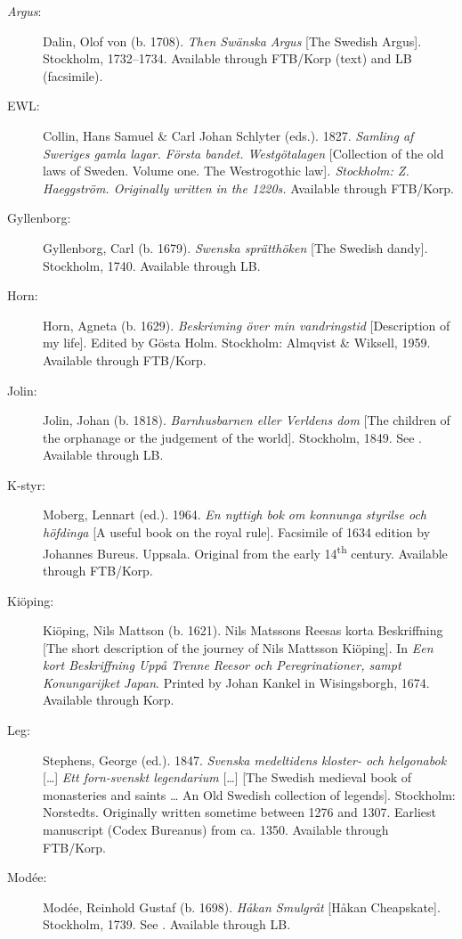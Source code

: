 \documentclass[output=paper]{langscibook}
\begin{document}
\begin{description}\sloppy
\item[\textit{Argus}:] Dalin, Olof von (b. 1708). \textit{Then Swänska Argus} [The Swedish Argus]. Stockholm, 1732–1734. Available through FTB/Korp (text) and LB (facsimile).
\item[EWL:] Collin, Hans Samuel \& Carl Johan Schlyter (eds.). 1827. \emph{Samling af Sweriges gamla lagar. Första bandet. Westgötalagen} [Collection of the old laws of Sweden. Volume one. The Westrogothic law]\emph{. \textup{Stockholm: Z. Haeggström}. \textup{Originally written in the 1220s.} }Available through FTB/Korp.
\item[Gyllenborg:] Gyllenborg, Carl (b. 1679). \textit{Swenska sprätthöken} [The Swedish dandy]. Stockholm, 1740. Available through LB.
\item[Horn:] Horn, Agneta (b. 1629). \textit{Beskrivning över min vandringstid} [Description of my life]. Edited by Gösta Holm. Stockholm: Almqvist \& Wiksell, 1959. Available through FTB/Korp.
\item[Jolin:] Jolin, Johan (b. 1818). \textit{Barnhusbarnen eller Verldens dom} [The children of the orphanage or the judgement of the world]. Stockholm, 1849. See \citet{MarttalaStromquist2001}. Available through LB.
\item[K-styr:] Moberg, Lennart (ed.). 1964. \textit{En nyttigh bok om konnunga styrilse och höfdinga} [A useful book on the royal rule]. Facsimile of 1634 edition by Johannes Bureus. Uppsala. Original from the early 14\textsuperscript{th} century. Available through FTB/Korp.
\item[Kiöping:] Kiöping, Nils Mattson (b. 1621). Nils Matssons Reesas korta Beskriffning [The short description of the journey of Nils Mattsson Kiöping]. In \textit{Een kort Beskriffning Uppå Trenne Reesor och Peregrinationer, sampt Konungarijket Japan}. Printed by Johan Kankel in Wisingsborgh, 1674. Available through Korp.
\item[Leg:] Stephens, George (ed.). 1847. \textit{Svenska medeltidens kloster- och helgonabok} […] \textit{Ett forn-svenskt legendarium} […] [The Swedish medieval book of monasteries and saints … An Old Swedish collection of legends]. Stockholm: Norstedts. Originally written sometime between 1276 and 1307. Earliest manuscript (Codex Bureanus) from ca. 1350. Available through FTB/Korp.
\item[Modée:] Modée, Reinhold Gustaf (b. 1698). \textit{Håkan Smulgråt} [Håkan Cheapskate]. Stockholm, 1739. See \citet{MarttalaStromquist2001}. Available through LB.

\end{description}
\end{document}
